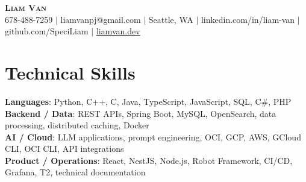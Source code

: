 \documentclass[letterpaper,11pt]{article}
\begin{document}

%
\begin{center}
    \textbf{\Huge \scshape Liam Van} \\ \vspace{1pt}
    \small 678-488-7259 $|$ \small {liamvanpj@gmail.com} $|$ Seattle, WA
 {{$|$ linkedin.com/in/liam-van} {$|$ github.com/SpeciLiam} {$|$ \href{https://liamvan.dev}{liamvan.dev}}}

\end{center}

\section{Technical Skills}
 \begin{itemize}[leftmargin=0.15in, label={}]
    \small{\item{
     \textbf{Languages}{: Python, C++, C, Java, TypeScript, JavaScript, SQL, C\#, PHP} \\
     \textbf{Backend / Data}{: REST APIs, Spring Boot, MySQL, OpenSearch, data processing, distributed caching, Docker} \\
     \textbf{AI / Cloud}{: LLM applications, prompt engineering, OCI, GCP, AWS, GCloud CLI, OCI CLI, API integrations} \\
     \textbf{Product / Operations}{: React, NestJS, Node.js, Robot Framework, CI/CD, Grafana, T2, technical documentation} \\
    }}
 \end{itemize}
%

\end{document}
